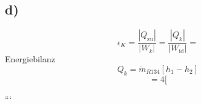 

\subsection*{d)}
\[
\epsilon_K = \frac{|Q_{\text{zu}}|}{|W_k|} = \frac{|Q_k|}{|W_{\text{id}}|} =
\]
Energiebilanz
\[
Q_k = \dot{m}_{R134} [h_1 - h_2]
\]
\[
= 4 [
\]

```